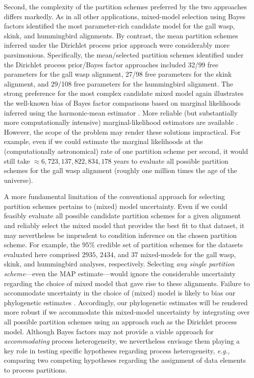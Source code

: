\documentclass[11pt]{article}
\begin{document}
Second, the complexity of the partition schemes preferred by the two approaches differs markedly.  
As in all other applications, mixed-model selection using Bayes factors identified the most parameter-rich candidate model for the gall wasp, skink, and hummingbird alignments.
By contrast, the mean partition schemes inferred under the Dirichlet process prior approach were considerably more parsimonious.  
Specifically, the mean/selected partition schemes identified under the Dirichlet process prior/Bayes factor approaches included 32/99 free parameters for the gall wasp alignment, 27/98 free parameters for the skink alignment, and 29/108 free parameters for the hummingbird alignment.  
The strong preference for the most complex candidate mixed model again illustrates the well-known bias of Bayes factor comparisons based on marginal likelihoods inferred using the harmonic-mean estimator \citep[{\it e.g.},][]{lartillot06, brown07, fan11, bael12, bael13}. 
More reliable (but substantially more computationally intensive) marginal-likelihood estimators are available \citep[{\it e.g.},][]{lartillot06, xie11, fan11, bael12, bael13, ronquist12}.
However, the scope of the problem may render these solutions impractical.
For example, even if we could estimate the marginal likelihoods at the (computationally astronomical) rate of one partition scheme per second, it would still take $\approx 6,723,137,822,834,178$ years to evaluate all possible partition schemes for the gall wasp alignment (roughly one million times the age of the universe). 

A more fundamental limitation of the conventional approach for selecting partition schemes pertains to (mixed) model uncertainty.
Even if we could feasibly evaluate all possible candidate partition schemes for a given alignment and reliably select the mixed model that provides the best fit to that dataset, it may nevertheless be imprudent to condition inference on the chosen partition scheme.
For example, the $95\%$ credible set of partition schemes for the datasets evaluated here comprised $2935$, $2434$, and $37$ mixed-models for the gall wasp, skink, and hummingbird analyses, respectively.
Selecting {\it any single partition scheme}---even the MAP estimate---would ignore the considerable uncertainty regarding the choice of mixed model that gave rise to these alignments.
Failure to accommodate uncertainty in the choice of (mixed) model is likely to bias our phylogenetic estimates \citep[{\it cf.},][]{huelsenbeck04d, li12}.
Accordingly, our phylogenetic estimates will be rendered more robust if we accommodate this mixed-model uncertainty by integrating over  all possible partition schemes using an approach such as the Dirichlet process  model.
Although Bayes factors may not provide a viable approach for \emph{accommodating} process heterogeneity, we nevertheless envisage them playing a key role in testing specific hypotheses regarding process heterogeneity, {\it e.g.}, comparing two competing hypotheses regarding the assignment of data elements to process partitions.
\end{document}

